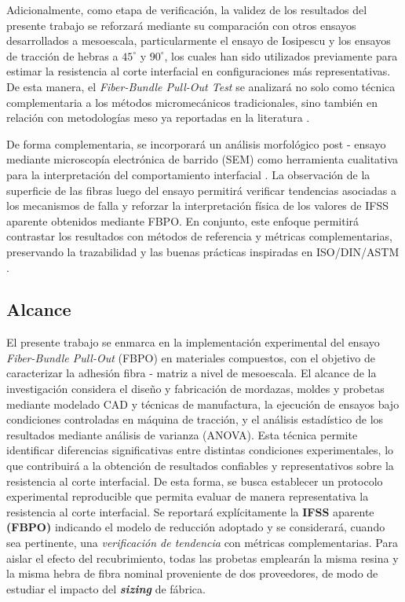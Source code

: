 Adicionalmente, como etapa de verificación, la validez de los resultados del presente trabajo se
reforzará mediante su comparación con otros ensayos desarrollados a mesoescala, particularmente 
el ensayo de Iosipescu y los ensayos de tracción de hebras a $45^\circ$ y $90^\circ$, los cuales
han sido utilizados previamente para estimar la resistencia al corte interfacial en configuraciones
más representativas. De esta manera, el \textit{Fiber-Bundle Pull-Out Test} se analizará no solo
como técnica complementaria a los métodos micromecánicos tradicionales, sino también en relación
con metodologías meso ya reportadas en la literatura \cite{DeLeon2022}.

De forma complementaria, se incorporará un análisis morfológico post - ensayo mediante microscopía
electrónica de barrido (SEM) como herramienta cualitativa para la interpretación del comportamiento
interfacial \cite{Lee2018}. La observación de la superficie de las fibras luego del ensayo permitirá verificar
tendencias asociadas a los mecanismos de falla y reforzar la interpretación física de los valores
de IFSS aparente obtenidos mediante FBPO. En conjunto, este enfoque permitirá contrastar los
resultados con métodos de referencia y métricas complementarias, preservando la trazabilidad y
las buenas prácticas inspiradas en ISO/DIN/ASTM
\cite{ISO19375,DINSPEC19289,ISO3341,DIN29965,ASTMD4475}.

\subsection{Alcance}
El presente trabajo se enmarca en la implementación experimental del ensayo \textit{Fiber-Bundle
Pull-Out} (FBPO) en materiales compuestos, con el objetivo de caracterizar la adhesión
fibra - matriz a nivel de mesoescala. El alcance de la investigación considera el diseño y
fabricación de mordazas, moldes y probetas mediante modelado CAD y técnicas de manufactura,
la ejecución de ensayos bajo condiciones controladas en máquina de tracción, y el análisis
estadístico de los resultados mediante análisis de varianza (ANOVA). Esta técnica permite
identificar diferencias significativas entre distintas condiciones experimentales, lo que
contribuirá a la obtención de resultados confiables y representativos sobre la resistencia al corte
interfacial. De esta forma, se busca establecer un protocolo experimental reproducible que
permita evaluar de manera representativa la resistencia al corte interfacial.
Se reportará explícitamente la \textbf{IFSS} aparente \textbf{(FBPO)} indicando el modelo de reducción
adoptado y se considerará, cuando sea pertinente, una \textit{verificación de tendencia} con métricas
complementarias. Para aislar el efecto del recubrimiento, todas las probetas emplearán la
misma resina y la misma hebra de fibra nominal proveniente
de dos proveedores, de modo de estudiar el impacto del \textbf{\textit{sizing}} de fábrica.

